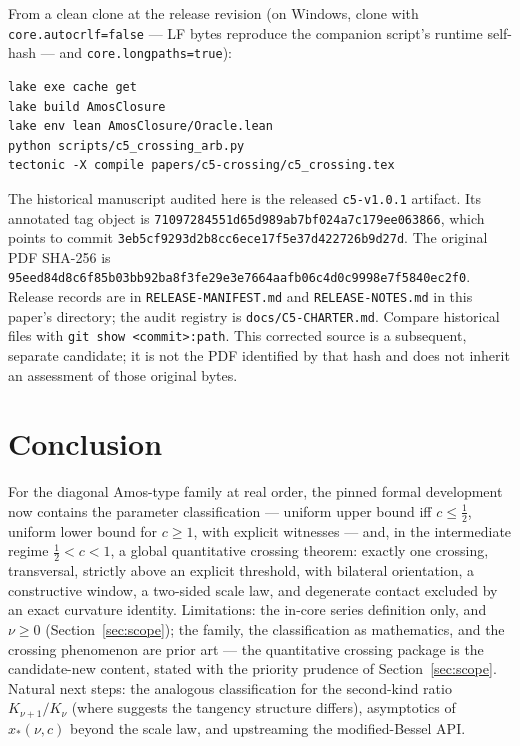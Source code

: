 \documentclass[11pt]{article}
\newcommand{\lean}[1]{\texttt{#1}}
\begin{document}
\medskip
\noindent From a clean clone at the release revision (on Windows,
clone with \lean{core.autocrlf=false} --- LF bytes reproduce the
companion script's runtime self-hash --- and
\lean{core.longpaths=true}):
\begin{verbatim}
lake exe cache get
lake build AmosClosure
lake env lean AmosClosure/Oracle.lean
python scripts/c5_crossing_arb.py
tectonic -X compile papers/c5-crossing/c5_crossing.tex
\end{verbatim}
{\sloppy
The historical manuscript audited here is the released
\lean{c5-v1.0.1} artifact.  Its annotated tag object is
\nolinkurl{71097284551d65d989ab7bf024a7c179ee063866}, which points to commit
\nolinkurl{3eb5cf9293d2b8cc6ece17f5e37d422726b9d27d}.
The original PDF SHA-256 is
\nolinkurl{95eed84d8c6f85b03bb92ba8f3fe29e3e7664aafb06c4d0c9998e7f5840ec2f0}.
Release records are in \lean{RELEASE-MANIFEST.md} and
\lean{RELEASE-NOTES.md} in this paper's directory; the audit registry is
\lean{docs/C5-CHARTER.md}.  Compare historical files with
\lean{git show <commit>:path}.  This corrected source is a subsequent,
separate candidate; it is not the PDF identified by that hash and does
not inherit an assessment of those original bytes.\par}

\section{Conclusion}

For the diagonal Amos-type family at real order, the pinned formal
development now contains the parameter classification ---
uniform upper bound iff $c \le \tfrac12$, uniform lower bound for
$c \ge 1$, with explicit witnesses --- and, in the
intermediate regime $\tfrac12 < c < 1$, a global quantitative
crossing theorem: exactly one crossing, transversal, strictly above
an explicit threshold, with bilateral orientation, a constructive
window, a two-sided scale law, and degenerate contact excluded by
an exact curvature identity.  Limitations: the in-core series
definition only, and $\nu \ge 0$ (Section~\ref{sec:scope}); the
family, the classification as mathematics, and the crossing
phenomenon are prior art \cite{RS16} --- the quantitative crossing
package is the candidate-new content, stated with the priority
prudence of Section~\ref{sec:scope}.  Natural next steps: the
analogous classification for the second-kind ratio
$K_{\nu+1}/K_\nu$ (where \cite{Segura23} suggests the tangency
structure differs), asymptotics of $x_*(\nu,c)$ beyond the scale
law, and upstreaming the modified-Bessel API.
\end{document}
